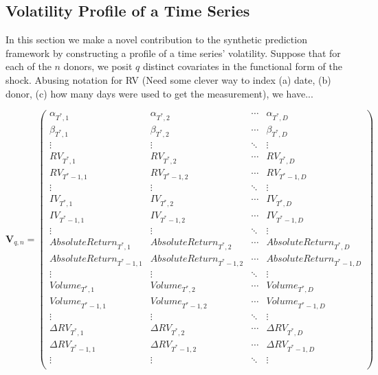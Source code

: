 \documentclass[11pt]{article}
\theoremstyle{definition}
\begin{document}
    \subsection{Volatility Profile of a Time Series}
    \label{Volatility Profile of a Time Series}
    
    In this section we make a novel contribution to the synthetic prediction framework by constructing a profile of a time series' volatility.  Suppose that for each of the $n$ donors, we posit $q$ distinct covariates in the functional form of the shock.  Abusing notation for RV (Need some clever way to index (a) date, (b) donor, (c) how many days were used to get the measurement), we have...

    \begin{equation*}
      \textbf{V}_{q,n} = 
      \begin{pmatrix}
      \alpha_{T^{*},1} & \alpha_{T^{*},2}  & \cdots & \alpha_{T^{*},D}  \\
      \beta_{T^{*},1} & \beta_{T^{*},2}  & \cdots & \beta_{T^{*},D}  \\
      \vdots  & \vdots  & \ddots & \vdots  \\
      RV_{T^{*},1} & RV_{T^{*},2}  & \cdots & RV_{T^{*},D}  \\
      RV_{T^{*}-1,1}  & RV_{T^{*}-1,2}  & \cdots & RV_{T^{*}-1,D}  \\
      \vdots  & \vdots  & \ddots & \vdots  \\
      IV_{T^{*},1} & IV_{T^{*},2} & \cdots & IV_{T^{*},D} \\
      IV_{T^{*}-1,1}  & IV_{T^{*}-1,2}  & \cdots & IV_{T^{*}-1,D} \\
      \vdots  & \vdots  & \ddots & \vdots  \\
      AbsoluteReturn_{T^{*},1} & AbsoluteReturn_{T^{*},2} & \cdots & AbsoluteReturn_{T^{*},D} \\
      AbsoluteReturn_{T^{*}-1,1}  & AbsoluteReturn_{T^{*}-1,2}  & \cdots & AbsoluteReturn_{T^{*}-1,D} \\
      \vdots  & \vdots  & \ddots & \vdots  \\
      Volume_{T^{*},1}  & Volume_{T^{*},2}  & \cdots & Volume_{T^{*},D} \\
      Volume_{T^{*}-1,1}  & Volume_{T^{*}-1,2}  & \cdots & Volume_{T^{*}-1,D}  \\
      \vdots  & \vdots  & \ddots & \vdots  \\
      \Delta RV_{T^{*},1} & \Delta RV_{T^{*},2}  & \cdots & \Delta RV_{T^{*},D}  \\
      \Delta RV_{T^{*}-1,1}  & \Delta RV_{T^{*}-1,2}  & \cdots & \Delta RV_{T^{*}-1,D}  \\
      \vdots  & \vdots  & \ddots & \vdots  \\
      \end{pmatrix}
      \end{equation*}
   
\end{document}

